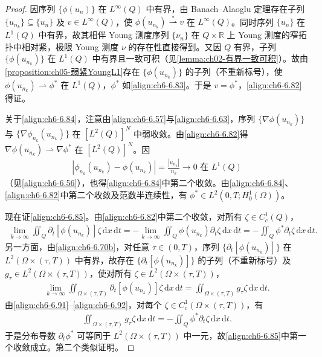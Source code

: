 \documentclass[../../main.tex]{subfiles}%
\begin{document}
\begin{proof}
因序列 $\{\phi(u_n)\}$ 在 $L^\infty(Q)$ 中有界，由 Banach--Alaoglu 定理存在子列 $\{u_{n_k}\}\subseteq\{u_n\}$ 及 $v\in L^\infty(Q)$，使 $\phi(u_{n_k})\stackrel{*}{\rightharpoonup}v$ 在 $L^\infty(Q)$。同时序列 $\{u_n\}$ 在 $L^1(Q)$ 中有界，故其相伴 Young 测度序列 $\{\nu_n\}$ 在 $Q\times\mathbb{R}$ 上 Young 测度的窄拓扑中相对紧，极限 Young 测度 $\nu$ 的存在性直接得到。又因 $Q$ 有界，子列 $\{\phi(u_{n_k})\}$ 在 $L^1(Q)$ 中有界且一致可积（见\cref{lemma:ch02-有界一致可积}）。故由\cref{proposition:ch05-弱紧YoungL1}存在 $\{\phi(u_{n_k})\}$ 的子列（不重新标号），使 $\phi(u_{n_k})\rightharpoonup\phi^*$ 在 $L^1(Q)$，$\phi^*$ 如\eqref{align:ch6-6.83}。于是 $v=\phi^*$，\eqref{align:ch6-6.82}得证。

关于\eqref{align:ch6-6.84}，注意由\eqref{align:ch6-6.57}与\eqref{align:ch6-6.63}，序列 $\{\nabla\phi(u_{n_k})\}$ 与 $\{\nabla\phi_{n_k}(u_{n_k})\}$ 在 $[L^2(Q)]^N$ 中弱收敛。由\eqref{align:ch6-6.82}得 $\nabla\phi(u_{n_k})\rightharpoonup\nabla\phi^*$ 在 $[L^2(Q)]^N$。因
\begin{align}
|\phi_{n_k}(u_{n_k})-\phi(u_{n_k})|=\frac{|u_{n_k}|}{n_k}\to0 \text{ 在 }L^1(Q) \label{align:ch6-6.90}
\end{align}
（见\eqref{align:ch6-6.56}），也得\eqref{align:ch6-6.84}中第二个收敛。由\eqref{align:ch6-6.84}、\eqref{align:ch6-6.82}中第二个收敛及范数半连续性，有 $\phi^*\in L^2(0,T;H^1_0(\Omega))$。

现在证\eqref{align:ch6-6.85}。由\eqref{align:ch6-6.82}中第二个收敛，对所有 $\zeta\in C^1_c(Q)$，
\begin{align}
\lim_{k\to\infty}\iint_Q\partial_t[\phi(u_{n_k})]\zeta\,\mathrm{d}x\,\mathrm{d}t
=-\lim_{k\to\infty}\iint_Q\phi(u_{n_k})\partial_t\zeta\,\mathrm{d}x\,\mathrm{d}t
=-\iint_Q\phi^*\partial_t\zeta\,\mathrm{d}x\,\mathrm{d}t. \label{align:ch6-6.91}
\end{align}
另一方面，由\eqref{align:ch6-6.70b}，对任意 $\tau\in(0,T)$，序列 $\{\partial_t[\phi(u_{n_k})]\}$ 在 $L^2(\Omega\times(\tau,T))$ 中有界，故存在 $\{\partial_t[\phi(u_{n_k})]\}$ 的子列（不重新标号）及 $g_\tau\in L^2(\Omega\times(\tau,T))$，使对所有 $\zeta\in L^2(\Omega\times(\tau,T))$，
\begin{align}
\lim_{k\to\infty}\iint_{\Omega\times(\tau,T)}\partial_t[\phi(u_{n_k})]\zeta\,\mathrm{d}x\,\mathrm{d}t
=\iint_{\Omega\times(\tau,T)}g_\tau\zeta\,\mathrm{d}x\,\mathrm{d}t. \label{align:ch6-6.92}
\end{align}
由\eqref{align:ch6-6.91}--\eqref{align:ch6-6.92}，对每个 $\zeta\in C^1_c(\Omega\times(\tau,T))$，有
\begin{align}
\iint_{\Omega\times(\tau,T)}g_\tau\zeta\,\mathrm{d}x\,\mathrm{d}t
=-\iint_Q\phi^*\partial_t\zeta\,\mathrm{d}x\,\mathrm{d}t. \label{align:ch6-6.93}
\end{align}
于是分布导数 $\partial_t\phi^*$ 可等同于 $L^2(\Omega\times(\tau,T))$ 中一元，故\eqref{align:ch6-6.85}中第一个收敛成立。第二个类似证明。


\end{proof}
\end{document}
